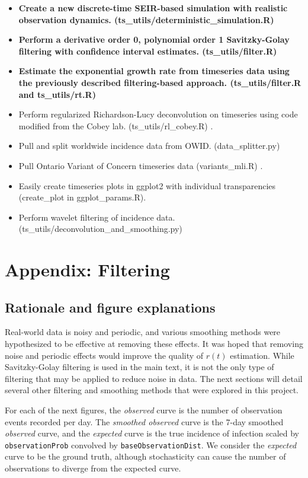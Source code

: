 \documentclass{article}
\newcommand{\code}[1]{\texttt{#1}}
\begin{document}
{\begin{itemize}
	\item \textbf{Create a new discrete-time SEIR-based simulation with realistic observation dynamics. (ts\_utils/deterministic\_simulation.R)}
	\item \textbf{Perform a derivative order 0, polynomial order 1 Savitzky-Golay filtering with confidence interval estimates. (ts\_utils/filter.R)}
	\item \textbf{Estimate the exponential growth rate from timeseries data using the previously described filtering-based approach. (ts\_utils/filter.R and ts\_utils/rt.R)}
	\item Perform regularized Richardson-Lucy deconvolution on timeseries using code modified from the Cobey lab. (ts\_utils/rl\_cobey.R) \cite{Gostic}.
	\item Pull and split worldwide incidence data from OWID. (data\_splitter.py) \cite{OWID}
	\item Pull Ontario Variant of Concern timeseries data (variants\_mli.R) \cite{mli}.
	\item Easily create timeseries plots in ggplot2 with individual transparencies (create\_plot in ggplot\_params.R).
	\item Perform wavelet filtering of incidence data. (ts\_utils/deconvolution\_and\_smoothing.py)
\end{itemize}

\section{Appendix: Filtering}
\subsection{Rationale and figure explanations}
Real-world data is noisy and periodic, and various smoothing methods were hypothesized to be effective at removing these effects. It was hoped that removing noise and periodic effects would improve the quality of $r(t)$ estimation. While Savitzky-Golay filtering is used in the main text, it is not the only type of filtering that may be applied to reduce noise in data. The next sections will detail several other filtering and smoothing methods that were explored in this project.

For each of the next figures, the \emph{observed} curve is the number of observation events recorded per day. The \emph {smoothed observed} curve is the 7-day smoothed \emph{observed} curve, and the \emph{expected} curve is the true incidence of infection scaled by \code{observationProb} convolved by \code{baseObservationDist}. We consider the \emph{expected} curve to be the ground truth, although stochasticity can cause the number of observations to diverge from the expected curve.


}
\end{document}
